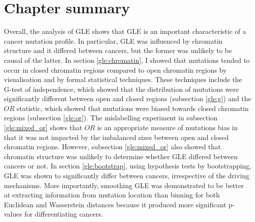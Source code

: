 

\section{Chapter summary}
Overall, the analysis of GLE shows that GLE is an important characteristic of a cancer mutation profile. In particular, GLE was influenced by chromatin structure and it differed between cancers, but the former was unlikely to be causal of the latter. In section \ref{gle:chromatin}, I showed that mutations tended to occur in closed chromatin regions compared to open chromatin regions by visualisation and by formal statistical techniques. These techniques include the G-test of independence, which showed that the distribution of mutations were significantly different between open and closed regions (subsection \ref{gle:g}) and the $OR$ statistic, which showed that mutations were biased towards closed chromatin regions (subsection \ref{gle:or}). The mislabelling experiment in subsection \ref{gle:mixed_or} shows that $OR$ is an appropriate measure of mutations bias in that it was not impacted by the imbalanced sizes between open and closed chromatin regions. However, subsection \ref{gle:mixed_or} also showed that chromatin structure was unlikely to determine whether GLE differed between cancers or not. In section \ref{gle:bootstrap}, using hypothesis tests by bootstrapping, GLE was shown to significantly differ between cancers, irrespective of the driving mechanisms. More importantly, smoothing GLE was demonstrated to be better at extracting information from mutation location than binning for both Euclidean and Wasserstein distances because it produced more significant p-values for differentiating cancers.
